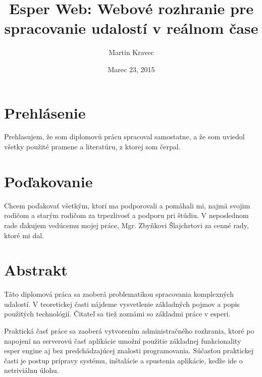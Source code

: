 \documentclass[12pt, a4paper, oneside]{book} %
\begin{document}
\title{Esper Web: Webové rozhranie pre spracovanie udalostí v reálnom čase}
\author{Martin Kravec}
\date{Marec 23, 2015}

\frontmatter

\maketitle \thispagestyle{empty} \emptydoublepage

\chapter*{Prehlásenie}
Prehlasujem, že som diplomovú prácu spracoval samostatne, a že som uviedol všetky použité pramene a literatúru, z ktorej som čerpal.

\emptydoublepage

\chapter*{Poďakovanie}
Chcem poďakovať všetkým, ktorí ma podporovali a pomáhali mi, najmä svojim rodičom a starým rodičom za trpezlivosť a podporu pri štúdiu. V neposlednom rade ďakujem vedúcemu mojej práce, Mgr. Zbyňkovi Šlajchrtovi za cenné rady, ktoré mi dal.

\emptydoublepage


\chapter*{Abstrakt}
Táto diplomová práca sa zaoberá problematikou spracovania komplexných udalostí. V teoretickej časti nájdeme vysvetlenie základných pojmov a popis použitých technológií. Čitateľ sa tiež zoznámi so základmi práce v esperi.

Praktická časť práce sa zaoberá vytvorením administračného rozhrania, ktoré po napojení na serverovú časť aplikácie umožní použitie základnej funkcionality esper engine aj bez predchádzajúcej znalosti programovania. Súčasťou praktickej časti je postup prípravy systému, inštalácie a spustenia aplikácie, keďže ide o netriviálnu úlohu.
\end{document}
